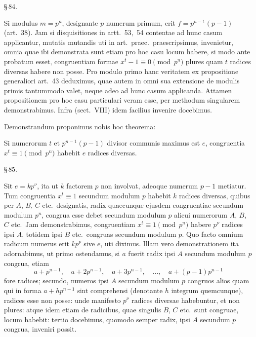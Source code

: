 \documentclass[12pt,a4paper]{article}
\theoremstyle{plain}
\theoremstyle{definition}
\theoremstyle{remark}
\begin{document}
\begin{center}\S\,84.\end{center}

Si modulus $m = p^n$, designante $p$ numerum primum, erit $f = p^{n-1}(p-1)$ (art.~38). Jam si disquisitiones in artt.~53,~54 contentae ad hunc casum applicantur, mutatis mutandis uti in art.\ praec.\ praescripsimus, invenietur, omnia quae ibi demonstrata sunt etiam pro hoc casu locum habere, si modo ante probatum esset, congruentiam formae $x^t - 1 \equiv 0 \pmod{p^n}$ plures quam $t$ radices diversas habere non posse. Pro modulo primo hanc veritatem ex propositione generaliori art.~43 deduximus, quae autem in omni sua extensione de modulis primis tantummodo valet, neque adeo ad hunc casum applicanda. Attamen propositionem pro hoc casu particulari veram esse, per methodum singularem demonstrabimus. Infra (sect.\ VIII) idem facilius invenire docebimus.

Demonstrandum proponimus nobis hoc theorema:

Si numerorum $t$ et $p^{n-1}(p-1)$ divisor communis maximus est $e$, congruentia $x^t \equiv 1 \pmod{p^n}$ habebit $e$ radices diversas.

\begin{center}\S\,85.\end{center}

Sit $e = kp^\nu$, ita ut $k$ factorem $p$ non involvat, adeoque numerum $p-1$ metiatur. Tum congruentia $x^t \equiv 1$ secundum modulum $p$ habebit $k$ radices diversas, quibus per $A$, $B$, $C$ etc.\ designatis, radix quaecunque ejusdem congruentiae secundum modulum $p^n$, congrua esse debet secundum modulum $p$ alicui numerorum $A$, $B$, $C$ etc.\ Jam demonstrabimus, congruentiam $x^t \equiv 1 \pmod{p^n}$ habere $p^\nu$ radices ipsi $A$, totidem ipsi $B$ etc.\ congruas secundum modulum $p$. Quo facto omnium radicum numerus erit $kp^\nu$ sive $e$, uti diximus. Illam vero demonstrationem ita adornabimus, ut primo ostendamus, si $a$ fuerit radix ipsi $A$ secundum modulum $p$ congrua, etiam
\[
a + p^{n-1},\quad a + 2p^{n-1},\quad a + 3p^{n-1},\quad \dots,\quad a + (p-1)p^{n-1}
\]
fore radices; secundo, numeros ipsi $A$ secundum modulum $p$ congruos alios quam qui in forma $a + hp^{n-1}$ sint comprehensi (denotante $h$ integrum quemcunque), radices esse non posse: unde manifesto $p^\nu$ radices diversae habebuntur, et non plures: atque idem etiam de radicibus, quae singulis $B$, $C$ etc.\ sunt congruae, locum habebit: tertio docebimus, quomodo semper radix, ipsi $A$ secundum $p$ congrua, inveniri possit.
\end{document}
